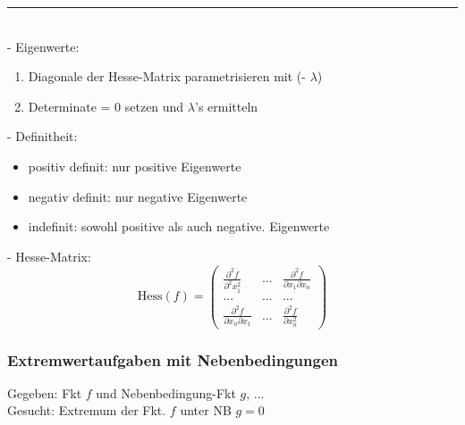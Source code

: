 \documentclass[6pt]{article}
\begin{document}
\begin{multicols*}{3}
	\vspace{-2mm}
  	\noindent\textcolor{gray}{\rule{9cm}{0.1pt}}
	\vspace{-2mm}\\
	
	- Eigenwerte: 
	\begin{enumerate}[label=(\roman*), itemsep=2pt, parsep=2pt]
		\item 	Diagonale der Hesse-Matrix parametrisieren mit (- $\lambda$)
		\item 	Determinate = 0 setzen und $\lambda$'s ermitteln 

	\end{enumerate}

	
	- Definitheit: 
	\begin{itemize}[itemsep=2pt, parsep=2pt]
			\item positiv definit:	  nur positive Eigenwerte
			\item negativ definit:   nur negative Eigenwerte
			\item indefinit:	 sowohl positive als auch negative. Eigenwerte
	\end{itemize}


	\vspace{2mm}
	- Hesse-Matrix:
	\vspace{2mm}
	\begin{equation*}
			\text{Hess}(f)=
				\begin{pmatrix}
					\frac{\partial^2 f}{\partial^2x_1^2} & ... & \frac{\partial^2 f}{\partial x_1 \partial x_n}\\
					...&...&...\\
					\frac{\partial^2 f}{\partial x_n \partial x_1} & ... & \frac{\partial^2 f}{\partial x_n^2}
				\end{pmatrix}
		\end{equation*}

		
	\columnbreak		
	\subsubsection*{Extremwertaufgaben mit Nebenbedingungen}	
	
	Gegeben: Fkt $f$ und Nebenbedingung-Fkt $g$, ... \\
	Gesucht: Extremum der Fkt. $f$ unter NB $g=0$
	

\end{multicols*}
\end{document}
